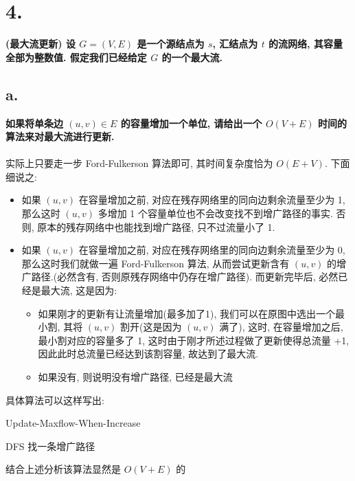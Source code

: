 \documentclass[UTF8]{article}
\newcommand{\jumpLine} {\hspace*{\fill} \\}
\begin{document}
\newpage
\section*{4.}
\noindent \textbf{(最大流更新) 设 $G=(V,E)$ 是一个源结点为 $s$, 汇结点为 $t$ 的流网络, 其容量全部为整数值. 假定我们已经给定 $G$ 的一个最大流.}
\subsection*{a.}
\noindent \textbf{如果将单条边 $(u,v)\in E$ 的容量增加一个单位, 请给出一个 $O(V+E)$ 时间的算法来对最大流进行更新.}\\
\jumpLine
实际上只要走一步 Ford-Fulkerson 算法即可, 其时间复杂度恰为 $O(E+V)$. 下面细说之:
\begin{itemize}
\item 如果 $(u,v)$ 在容量增加之前, 对应在残存网络里的同向边剩余流量至少为 1, 那么这时 $(u,v)$ 多增加 1 个容量单位也不会改变找不到增广路径的事实. 否则, 原本的残存网络中也能找到增广路径, 只不过流量小了 1.
\item 如果 $(u,v)$ 在容量增加之前, 对应在残存网络里的同向边剩余流量至少为 0, 那么这时我们就做一遍 Ford-Fulkerson 算法, 从而尝试更新含有 $(u,v)$ 的增广路径.(必然含有, 否则原残存网络中仍存在增广路径). 而更新完毕后, 必然已经是最大流, 这是因为:
	\begin{itemize}
	\item 如果刚才的更新有让流量增加(最多加了1), 我们可以在原图中选出一个最小割, 其将 $(u,v)$ 割开(这是因为 $(u,v)$ 满了), 这时, 在容量增加之后, 最小割对应的容量多了 1, 这时由于刚才所述过程做了更新使得总流量 +1, 因此此时总流量已经达到该割容量, 故达到了最大流.
	\item 如果没有, 则说明没有增广路径, 已经是最大流
	\end{itemize}
\end{itemize}
具体算法可以这样写出:
\begin{algorithm}[H]
	\caption{{\sc Update-Maxflow-When-Increase}}
	\begin{algorithmic}[1] %
	\State DFS 找一条增广路径
	 
	\Else {}
	\EndIf
	\end{algorithmic}
\end{algorithm}
结合上述分析该算法显然是 $O(V+E)$ 的
\end{document}
